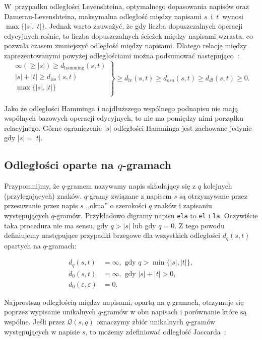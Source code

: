 \documentclass{praca1}
\begin{document}
W~przypadku odległości Levenshteina, optymalnego dopasowania napisów oraz Damerau-Levenshteina, maksymalna odległość między napisami $s$~i~$t$~wynosi $\max\{|s|, |t|\}$. Jednak warto zauważyć, że gdy liczba dopuszczalnych operacji edycyjnych rośnie, to liczba dopuszczalnych ścieżek między napisami wzrasta, co pozwala czasem zmniejszyć odległość między napisami. Dlatego relację między zaprezentowanymi powyżej odległościami można podsumować następująco~\cite{Loo2014:stringdist}:
$$
\left. \begin{array}{r}
\infty (\geq |s|) \geq d_{\mathrm{hamming}}(s,t) \\
|s| + |t| \geq d_{\mathrm{lcs}}(s,t) \\
\max\{|s|, |t|\} \\
\end{array} \right \}
\geq d_{\mathrm{lv}}(s,t) \geq d_{osa}(s,t) \geq d_{dl}(s,t) \geq 0.
$$

Jako że odległości Hamminga i najdłuższego wspólnego podnapisu nie mają wspólnych bazowych operacji edycyjnych, to nie ma pomiędzy nimi porządku relacyjnego. Górne ograniczenie $|s|$ odległości Hamminga jest zachowane jedynie gdy $|s| = |t|$.







\subsection{Odległości oparte na $q$-gramach}

Przypomnijmy, że $q$-gramem nazywamy napis składający się z $q$ kolejnych (przylegających) znaków. $q$-gramy związane z napisem $s$ są otrzymywane przez przesuwanie przez napis $s$ ,,okna'' o szerokości $q$ znaków i zapisaniu występujących $q$-gramów. Przykładowo digramy napisu \verb|ela| to \verb|el| i \verb|la|. Oczywiście taka procedura nie ma sensu, gdy $q > |s|$ lub gdy $q = 0$. Z tego powodu definiujemy następujące przypadki brzegowe dla wszystkich odległości $d_q(s,t)$ opartych na $q$-gramach:

\begin{align*}
d_q(s,t) &= \infty, \text{ gdy } q > \min\{|s|, |t|\},\\
d_0(s,t) &= \infty, \text{ gdy } |s| + |t| > 0, \\
d_0(\varepsilon,\varepsilon) &= 0.
\end{align*}

Najprostszą odległością między napisami, opartą na $q$-gramach, otrzymuje się poprzez wypisanie unikalnych $q$-gramów w obu napisach i porównanie które są wspólne. Jeśli przez $\mathcal{Q}(s,q)$ oznaczymy zbiór unikalnych $q$-gramów występujących w napisie $s$, to możemy zdefiniować odległość Jaccarda~\cite{Loo2014:stringdist}:
\end{document}
